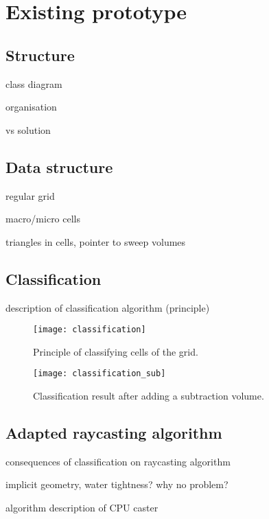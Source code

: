 \section{Existing prototype}
\label{sec:existing_prototype}


\subsection{Structure}
class diagram

organisation

vs solution


\subsection{Data structure}
\label{sec:data_structure}

regular grid

macro/micro cells

triangles in cells, pointer to sweep volumes


\subsection{Classification}

description of classification algorithm (principle)

\begin{figure}
\centering
\texttt{[image: classification]}
\caption{Principle of classifying cells of the grid.}
\label{fig:classification}
\end{figure}

\begin{figure}
\centering
\texttt{[image: classification\_sub]}
\caption{Classification result after adding a subtraction volume. }
\label{fig:classification_sub}
\end{figure}

\subsection{Adapted raycasting algorithm}

consequences of classification on raycasting algorithm

implicit geometry, water tightness? why no problem?

algorithm description of CPU caster

